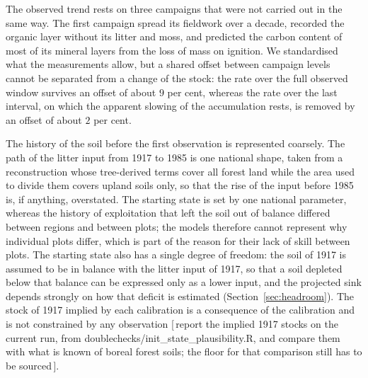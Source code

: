 \documentclass[11pt]{article}
\newcommand{\gap}[1]{\textcolor{red!70!black}{\small[\,#1\,]}}
\begin{document}
The observed trend rests on three campaigns that were not carried out in the same way.
The first campaign spread its fieldwork over a decade, recorded the organic layer
without its litter and moss, and predicted the carbon content of most of its mineral
layers from the loss of mass on ignition. We standardised what the measurements allow,
but a shared offset between campaign levels cannot be separated from a change of the
stock: the rate over the full observed window survives an offset of about $9$ per cent,
whereas the rate over the last interval, on which the apparent slowing of the
accumulation rests, is removed by an offset of about $2$ per cent.

The history of the soil before the first observation is represented coarsely. The path
of the litter input from 1917 to 1985 is one national shape, taken from a reconstruction
whose tree-derived terms cover all forest land while the area used to divide them covers
upland soils only, so that the rise of the input before 1985 is, if anything, overstated.
The starting state is set by one national parameter, whereas the history of exploitation
that left the soil out of balance differed between regions and between plots; the models
therefore cannot represent why individual plots differ, which is part of the reason for
their lack of skill between plots. The starting state also has a single degree of freedom: the soil of 1917
is assumed to be in balance with the litter input of 1917, so that a soil depleted below
that balance can be expressed only as a lower input, and the projected sink depends
strongly on how that deficit is estimated (Section~\ref{sec:headroom}). The stock of 1917 implied by each calibration is a
consequence of the calibration and is not constrained by any observation
\gap{report the implied 1917 stocks on the current run, from
doublechecks/init\_state\_plausibility.R, and compare them with what is known of boreal
forest soils; the floor for that comparison still has to be sourced}.
\end{document}
